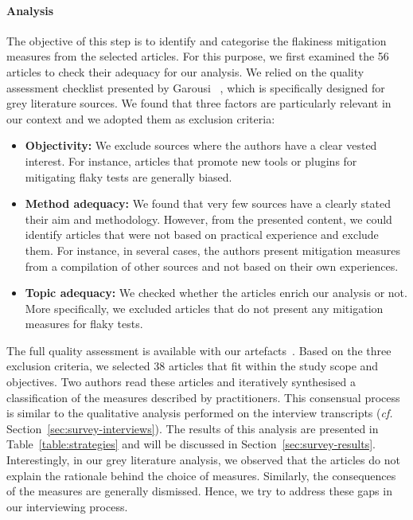 \paragraph{Analysis}
The objective of this step is to identify and categorise the flakiness mitigation measures from the selected articles.
For this purpose, we first examined the 56 articles to check their adequacy for our analysis.
We relied on the quality assessment checklist presented by Garousi \etal~\cite{garousi2019guidelines}, which is specifically designed for grey literature sources.
We found that three factors are particularly relevant in our context and we adopted them as exclusion criteria:
\begin{itemize}[wide=10pt,noitemsep,topsep=0pt]
    \item \textbf{Objectivity:} We exclude sources where the authors have a clear vested interest. For instance, articles that promote new tools or plugins for mitigating flaky tests are generally biased.
    \item \textbf{Method adequacy:} We found that very few sources have a clearly stated their aim and methodology. However, from the presented content, we could identify articles that were not based on practical experience and exclude them. 
    For instance, in several cases, the authors present mitigation measures from a compilation of other sources and not based on their own experiences.
    \item \textbf{Topic adequacy:} We checked whether the articles enrich our analysis or not. More specifically, we excluded articles that do not present any mitigation measures for flaky tests.
\end{itemize}
The full quality assessment is available with our artefacts~\cite{artefacts}.
Based on the three exclusion criteria, we selected 38 articles that fit within the study scope and objectives.
Two authors read these articles and iteratively synthesised a classification of the measures described by practitioners.
This consensual process is similar to the qualitative analysis performed on the interview transcripts (\textit{cf.} Section~\ref{sec:survey-interviews}).
The results of this analysis are presented in Table~\ref{table:strategies} and will be discussed in Section~\ref{sec:survey-results}.
Interestingly, in our grey literature analysis, we observed that the articles do not explain the rationale behind the choice of measures.
Similarly, the consequences of the measures are generally dismissed.
Hence, we try to address these gaps in our interviewing process.

